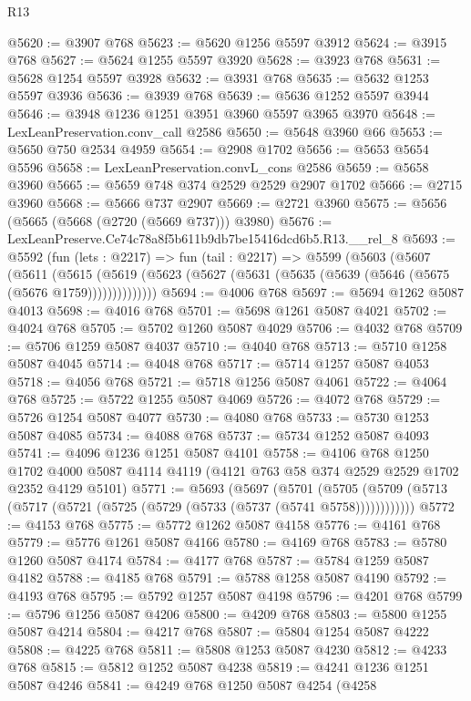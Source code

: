 \begin{lexlean}{R13}
\begin{coremodule}
@5620 := @3907 @768
@5623 := @5620 @1256 @5597 @3912
@5624 := @3915 @768
@5627 := @5624 @1255 @5597 @3920
@5628 := @3923 @768
@5631 := @5628 @1254 @5597 @3928
@5632 := @3931 @768
@5635 := @5632 @1253 @5597 @3936
@5636 := @3939 @768
@5639 := @5636 @1252 @5597 @3944
@5646 := @3948 @1236 @1251 @3951 @3960 @5597 @3965 @3970
@5648 := LexLeanPreservation.conv_call @2586
@5650 := @5648 @3960 @66
@5653 := @5650 @750 @2534 @4959
@5654 := @2908 @1702
@5656 := @5653 @5654 @5596
@5658 := LexLeanPreservation.convL_cons @2586
@5659 := @5658 @3960
@5665 := @5659 @748 @374 @2529 @2529 @2907 @1702
@5666 := @2715 @3960
@5668 := @5666 @737 @2907
@5669 := @2721 @3960
@5675 := @5656 (@5665 (@5668 (@2720 (@5669 @737))) @3980)
@5676 := LexLeanPreserve.Ce74c78a8f5b611b9db7be15416dcd6b5.R13.__rel_8
@5693 := @5592
    (fun (lets : @2217) =>
    fun (tail : @2217) =>
    @5599
      (@5603
        (@5607
          (@5611
            (@5615
              (@5619 (@5623 (@5627 (@5631 (@5635 (@5639 (@5646 (@5675 (@5676 @1759))))))))))))))
@5694 := @4006 @768
@5697 := @5694 @1262 @5087 @4013
@5698 := @4016 @768
@5701 := @5698 @1261 @5087 @4021
@5702 := @4024 @768
@5705 := @5702 @1260 @5087 @4029
@5706 := @4032 @768
@5709 := @5706 @1259 @5087 @4037
@5710 := @4040 @768
@5713 := @5710 @1258 @5087 @4045
@5714 := @4048 @768
@5717 := @5714 @1257 @5087 @4053
@5718 := @4056 @768
@5721 := @5718 @1256 @5087 @4061
@5722 := @4064 @768
@5725 := @5722 @1255 @5087 @4069
@5726 := @4072 @768
@5729 := @5726 @1254 @5087 @4077
@5730 := @4080 @768
@5733 := @5730 @1253 @5087 @4085
@5734 := @4088 @768
@5737 := @5734 @1252 @5087 @4093
@5741 := @4096 @1236 @1251 @5087 @4101
@5758 := @4106
    @768
    @1250
    @1702
    @4000
    @5087
    @4114
    @4119
    (@4121 @763 @58 @374 @2529 @2529 @1702 @2352 @4129 @5101)
@5771 := @5693
    (@5697
      (@5701 (@5705 (@5709 (@5713 (@5717 (@5721 (@5725 (@5729 (@5733 (@5737 (@5741 @5758))))))))))))
@5772 := @4153 @768
@5775 := @5772 @1262 @5087 @4158
@5776 := @4161 @768
@5779 := @5776 @1261 @5087 @4166
@5780 := @4169 @768
@5783 := @5780 @1260 @5087 @4174
@5784 := @4177 @768
@5787 := @5784 @1259 @5087 @4182
@5788 := @4185 @768
@5791 := @5788 @1258 @5087 @4190
@5792 := @4193 @768
@5795 := @5792 @1257 @5087 @4198
@5796 := @4201 @768
@5799 := @5796 @1256 @5087 @4206
@5800 := @4209 @768
@5803 := @5800 @1255 @5087 @4214
@5804 := @4217 @768
@5807 := @5804 @1254 @5087 @4222
@5808 := @4225 @768
@5811 := @5808 @1253 @5087 @4230
@5812 := @4233 @768
@5815 := @5812 @1252 @5087 @4238
@5819 := @4241 @1236 @1251 @5087 @4246
@5841 := @4249
    @768
    @1250
    @5087
    @4254
    (@4258

\end{coremodule}
\end{lexlean}

